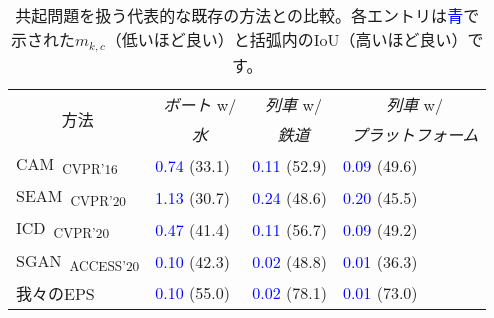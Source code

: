 
\newcommand{\R}{\textcolor{red}}
\newcommand{\B}{\textcolor{blue}}

\begin{table}[]
\centering
{\small
\begin{tabular}{@{}llll@{}}
\toprule
\multicolumn{1}{c}{\multirow{2}{*}{方法}} & \multicolumn{1}{c}{~\emph{ボート} w/}   & \multicolumn{1}{c}{~\emph{列車} w/}  & \multicolumn{1}{c}{~\emph{列車} w/}  \\
& \multicolumn{1}{c}{~\emph{水}} & \multicolumn{1}{c}{~\emph{鉄道}}          & \multicolumn{1}{c}{~\emph{プラットフォーム}}  \\ \midrule
\multicolumn{1}{l}{CAM~\cite{zhou2016learning}\textsubscript{CVPR'16}}              & \B{0.74} (33.1)   & \B{0.11} (52.9)   & \multicolumn{1}{l}{\B{0.09} (49.6)}   \\
\multicolumn{1}{l}{SEAM~\cite{wang2020self}\textsubscript{CVPR'20}}                 & \B{1.13} (30.7)   & \B{0.24} (48.6)   & \multicolumn{1}{l}{\B{0.20} (45.5)}   \\
\multicolumn{1}{l}{ICD~\cite{fan2020learning}\textsubscript{CVPR'20}}               & \B{0.47} (41.4)   & \B{0.11} (56.7)   & \multicolumn{1}{l}{\B{0.09} (49.2)}   \\
\multicolumn{1}{l}{SGAN~\cite{yao2020saliency}\textsubscript{ACCESS'20}}            & \B{0.10} (42.3)   & \B{0.02} (48.8)   & \multicolumn{1}{l}{\B{0.01} (36.3)}   \\
\multicolumn{1}{l}{我々のEPS}                                                         & \B{0.10} (55.0)   & \B{0.02} (78.1)   & \multicolumn{1}{l}{\B{0.01} (73.0)}   \\ \bottomrule
\end{tabular}
}
\vspace{2mm}
\caption{共起問題を扱う代表的な既存の方法との比較。各エントリは\B{青}で示された{$m_{k,c}$}（低いほど良い）と括弧内のIoU（高いほど良い）です。} \vspace{-2mm}
\label{tab:co_quantitative_v4}

\end{table}
